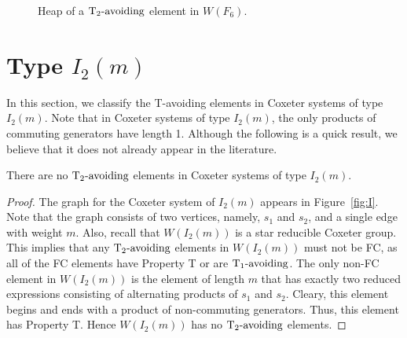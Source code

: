 \begin{figure}[h!]\centering
{}
\caption{Heap of a $\operatorname{T_2-\mathrm{avoiding}}$ element in $W(F_6)$.}\label{fig:f6bat}
\end{figure}


\section{Type $I_2(m)$}\label{sec:tavoidI}

In this section, we classify the T-avoiding elements in Coxeter systems of type $I_2(m)$. Note that in Coxeter systems of type $I_2(m)$, the only products of commuting generators have length 1. Although the following is a quick result, we believe that it does not already appear in the literature.
\begin{theorem}\label{thm:i2m}
There are no $\operatorname{T_2-\mathrm{avoiding}}$ elements in Coxeter systems of type $I_2(m)$.
\begin{proof}
	The graph for the Coxeter system of $I_2(m)$ appears in Figure~\ref{fig:I}. Note that the graph consists of two vertices, namely, $s_1$ and $s_2$, and a single edge with weight $m$. Also, recall that $W(I_2(m))$ is a star reducible Coxeter group. This implies that any $\operatorname{T_2-\mathrm{avoiding}}$ elements in $W(I_2(m))$ must not be FC, as all of the FC elements have Property T or are $\operatorname{T_1-\mathrm{avoiding}}$. The only non-FC element in $W(I_2(m))$ is the element of length $m$ that has exactly two reduced expressions consisting of alternating products of $s_1$ and $s_2$. Cleary, this element begins and ends with a product of non-commuting generators. Thus, this element has Property T. Hence $W(I_2(m))$ has no $\operatorname{T_2-\mathrm{avoiding}}$ elements. 
\end{proof}	
\end{theorem}
 



